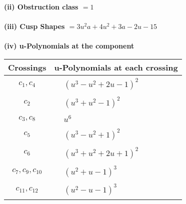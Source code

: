 \documentclass[1p]{elsarticle_modified}
\theoremstyle{definition}
\begin{document}
\flushleft \textbf{(ii) Obstruction class $= 1$}\\~\\
\flushleft \textbf{(iii) Cusp Shapes $= 3 u^2 a+4 u^2+3 a-2 u-15$}\\~\\
\newpage\renewcommand{\arraystretch}{1}
\flushleft \textbf{(iv) u-Polynomials at the component}\newline \\
\begin{tabular}{m{50pt}|m{274pt}}
Crossings & \hspace{64pt}u-Polynomials at each crossing \\
\hline $$\begin{aligned}c_{1},c_{4}\end{aligned}$$&$\begin{aligned}
&(u^3- u^2+2 u-1)^2
\end{aligned}$\\
\hline $$\begin{aligned}c_{2}\end{aligned}$$&$\begin{aligned}
&(u^3+u^2-1)^2
\end{aligned}$\\
\hline $$\begin{aligned}c_{3},c_{8}\end{aligned}$$&$\begin{aligned}
&u^6
\end{aligned}$\\
\hline $$\begin{aligned}c_{5}\end{aligned}$$&$\begin{aligned}
&(u^3- u^2+1)^2
\end{aligned}$\\
\hline $$\begin{aligned}c_{6}\end{aligned}$$&$\begin{aligned}
&(u^3+u^2+2 u+1)^2
\end{aligned}$\\
\hline $$\begin{aligned}c_{7},c_{9},c_{10}\end{aligned}$$&$\begin{aligned}
&(u^2+u-1)^3
\end{aligned}$\\
\hline $$\begin{aligned}c_{11},c_{12}\end{aligned}$$&$\begin{aligned}
&(u^2- u-1)^3
\end{aligned}$\\
\hline
\end{tabular}\\~\\
\end{document}
